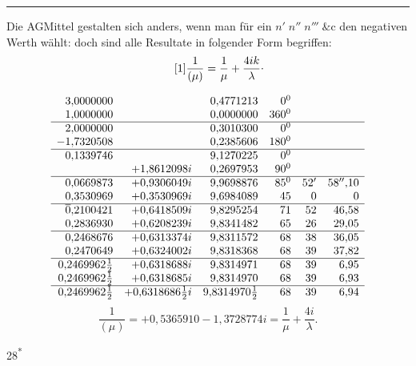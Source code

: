 \par\medskip\hrule
{}
\par\indent Die AGMittel gestalten sich anders, wenn man für ein \(n'\;n''\;n'''\;\&\mathrm c\) den negativen Werth wählt: doch sind alle Resultate in folgender Form begriffen:
\begin{equation*}\tag*{[1]}
\frac1{(\mu)}=\frac1\mu+\frac{4ik}\lambda\mathpunct{\raisebox{.5ex}{.}}
\end{equation*}
\begin{center}\end{center}
{\small\setlength{\arraycolsep}{4pt}\renewcommand{\arraystretch}{1.25}
\[\begin{array}{rrr rrr}
3{,}0000000&&0{,}4771213&0^0&&\\
1{,}0000000&&0{,}0000000&360^0&&\\\hline
2{,}0000000&&0{,}3010300&0^0&&\\
-1{,}7320508&&0{,}2385606&180^0&&\\\hline
0{,}1339746&&9{,}1270225&0^0&&\\
&+1{,}8612098i&0{,}2697953&90^0&&\\\hline
0{,}0669873&+0{,}9306049i&9{,}9698876&85^0&52'&58''{,}10\\
0{,}3530969&+0{,}3530969i&9{,}6984089&45&0&0\\\hline
\overline0{,}2100421&+0{,}6418509i&9{,}8295254&71&52&46{,}58\\
0{,}2836930&+0{,}6208239i&9{,}8341482&65&26&29{,}05\\\hline
0{,}2468676&+0{,}6313374i&9{,}8311572&68&38&36{,}05\\
0{,}2470649&+0{,}6324002i&9{,}8318368&68&39&37{,}82\\\hline
0{,}2469962\frac12&+0{,}6318688i&9{,}8314971&68&39&6{,}95\\
0{,}2469962\frac12&+0{,}6318685i&9{,}8314970&68&39&6{,}93\\\hline
0{,}2469962\frac12&+0{,}6318686\frac12i&9{,}8314970\frac12&68&39&6{,}94
\end{array}\]}
\[\frac1{(\mu)}=+0{,}5365910-1{,}3728774i=\frac1\mu+\frac{4i}\lambda.\]
\par\bigskip\hfill\small28\textsuperscript{*}\normalsize
\clearpage\endgroup
